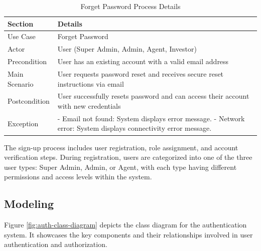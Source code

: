 \begin{table}[htbp]
    \centering
    \begin{tabular}{|l|p{}|}
        \hline
        \textbf{Section} & \textbf{Details} \\
        \hline
        Use Case & Forget Password \\
        \hline
        Actor & User (Super Admin, Admin, Agent, Investor) \\
        \hline
        Precondition & User has an existing account with a valid email address \\
        \hline
        Main Scenario & 
        User requests password reset and receives secure reset instructions via email \\
        \hline
        Postcondition & User successfully resets password and can access their account with new credentials \\
        \hline
        Exception & 
        - Email not found: System displays error message.
        - Network error: System displays connectivity error message. \\
        \hline
    \end{tabular}
    \caption{Forget Password Process Details}
    \label{tab:forget_password_process}
\end{table}

The sign-up process includes user registration, role assignment, and account verification steps. During registration, users are categorized into one of the three user types: Super Admin, Admin, or Agent, with each type having different permissions and access levels within the system.
\newpage

\subsection{Modeling}

Figure \ref{fig:auth-class-diagram} depicts the class diagram for the authentication system. It showcases the key components and their relationships involved in user authentication and authorization.

